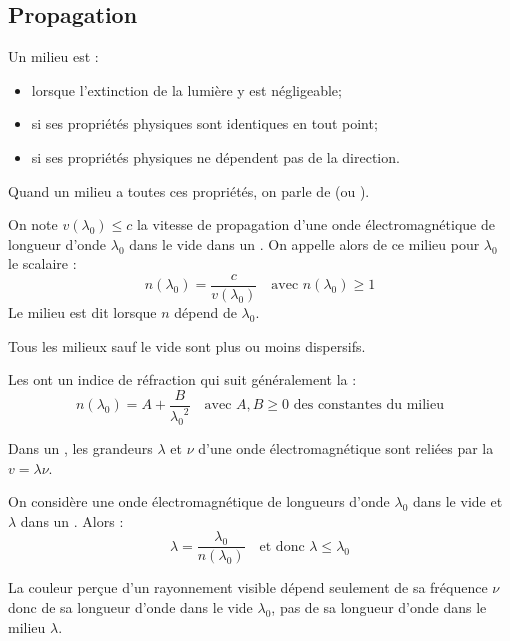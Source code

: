 \subsection{Propagation}

\begin{definitions}
Un milieu est :
\begin{itemize}
\item {} lorsque l'extinction de la lumière y est négligeable;
\item {} si ses propriétés physiques sont identiques en tout point;
\item {} si ses propriétés physiques ne dépendent pas de la direction.
\end{itemize}
Quand un milieu a toutes ces propriétés, on parle de  (ou ).
\end{definitions}

\begin{definition}
On note $v(\lambda_0) \leq c$ la vitesse de propagation d'une onde électromagnétique de longueur d'onde $\lambda_0$ dans le vide dans un . On appelle alors  de ce milieu pour $\lambda_0$ le scalaire :
\[n(\lambda_0) = \frac{c}{v(\lambda_0)} \quad \text{avec } n(\lambda_0) \geq 1\] 
Le milieu est dit  lorsque $n$ dépend de $\lambda_0$.
\end{definition}

\begin{remarque}
Tous les milieux sauf le vide sont plus ou moins dispersifs.
\end{remarque}

\begin{propriete}[admis]
Les  ont un indice de réfraction qui suit généralement la  :
\[n(\lambda_0) = A + \frac{B}{{\lambda_0}^2} \quad \text{avec } A, B \geq 0 \text{ des constantes du milieu}\]
\end{propriete}

\begin{propriete}[admis]
Dans un , les grandeurs $\lambda$ et $\nu$ d'une onde électromagnétique sont reliées par la  $v = \lambda \nu$.
\end{propriete}

\begin{propriete}
On considère une onde électromagnétique de longueurs d'onde $\lambda_0$ dans le vide et $\lambda$ dans un . Alors :
\[\lambda = \frac{\lambda_0}{n(\lambda_0)} \quad \text{et donc } \lambda \leq \lambda_0\]
\end{propriete}

\begin{remarque}
La couleur perçue d'un rayonnement visible dépend seulement de sa fréquence $\nu$ donc de sa longueur d'onde dans le vide $\lambda_0$, pas de sa longueur d'onde dans le milieu $\lambda$.
\end{remarque}